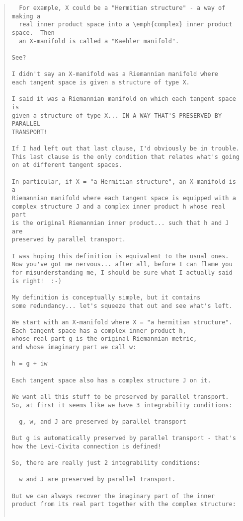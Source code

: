 \begin{quote}
\begin{verbatim}
  For example, X could be a "Hermitian structure" - a way of making a
  real inner product space into a \emph{complex} inner product space.  Then 
  an X-manifold is called a "Kaehler manifold".

See?   

I didn't say an X-manifold was a Riemannian manifold where
each tangent space is given a structure of type X.

I said it was a Riemannian manifold on which each tangent space is
given a structure of type X... IN A WAY THAT'S PRESERVED BY PARALLEL
TRANSPORT!

If I had left out that last clause, I'd obviously be in trouble.
This last clause is the only condition that relates what's going
on at different tangent spaces.

In particular, if X = "a Hermitian structure", an X-manifold is a
Riemannian manifold where each tangent space is equipped with a
complex structure J and a complex inner product h whose real part 
is the original Riemannian inner product... such that h and J are
preserved by parallel transport.

I was hoping this definition is equivalent to the usual ones.  
Now you've got me nervous... after all, before I can flame you 
for misunderstanding me, I should be sure what I actually said 
is right!  :-)

My definition is conceptually simple, but it contains
some redundancy... let's squeeze that out and see what's left.

We start with an X-manifold where X = "a hermitian structure".
Each tangent space has a complex inner product h,
whose real part g is the original Riemannian metric, 
and whose imaginary part we call w:

h = g + iw

Each tangent space also has a complex structure J on it.

We want all this stuff to be preserved by parallel transport.
So, at first it seems like we have 3 integrability conditions:

  g, w, and J are preserved by parallel transport

But g is automatically preserved by parallel transport - that's
how the Levi-Civita connection is defined!  

So, there are really just 2 integrability conditions:

  w and J are preserved by parallel transport.

But we can always recover the imaginary part of the inner
product from its real part together with the complex structure:


\end{verbatim}
\end{quote}

